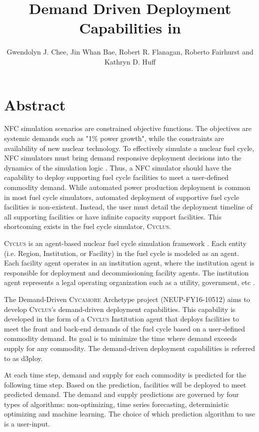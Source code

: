 \documentclass{anstrans}
\title{Demand Driven Deployment Capabilities in \Cyclus}
\author{Gwendolyn J. Chee, Jin Whan Bae, Robert R. Flanagan, Roberto Fairhurst and Kathryn D. Huff}
\institute{
Dept. of Nuclear, Plasma and Radiological Engineering, University of Illinois at Urbana-Champaign \\
gchee2@illinois.edu
}
\newcommand{\Cyclus}{\textsc{Cyclus}\xspace}%
\newcommand{\Cycamore}{\textsc{Cycamore}\xspace}%
\begin{document}
\section{Abstract}
\gls{NFC} simulation scenarios are constrained objective functions. 
The objectives are systemic demands such as "1\% power growth", while the 
constraints are availability of new nuclear technology. 
To effectively simulate a nuclear fuel cycle, \gls{NFC} simulators 
must bring demand responsive deployment decisions into the dynamics of the 
simulation logic \cite{huff_current_2017}. 
Thus, a \gls{NFC} simulator should have the capability to deploy 
supporting fuel cycle facilities to meet a user-defined commodity demand. 
While automated power production deployment is common in most fuel cycle simulators, automated deployment of supportive fuel cycle 
facilities is non-existent. 
Instead, the user must detail the deployment timeline of all supporting 
facilities or have infinite capacity support facilities. This shortcoming 
exists in the fuel cycle simulator, \Cyclus. 

\Cyclus is an agent-based nuclear fuel cycle simulation framework 
\cite{huff_fundamental_2016}. 
Each entity (i.e. Region, Institution, or Facility) in the fuel cycle is modeled 
as an agent. 
Each facility agent operates in an institution agent, where the institution 
agent is responsible for deployment and decommissioning facility agents. 
The institution agent represents a legal operating organization such as a 
utility, government, etc \cite{huff_fundamental_2016}. 

The Demand-Driven \Cycamore Archetype project (NEUP-FY16-10512) aims to 
develop \Cyclus's demand-driven deployment capabilities. 
This capability is developed in the form of a \Cyclus Institution agent that 
deploys facilities to meet the front and back-end demands of the fuel cycle 
based on a user-defined commodity demand. 
Its goal is to minimize the time where demand exceeds supply for any commodity.
The demand-driven deployment capabilities is referred to as d3ploy. 

At each time step, demand and supply for each commodity is predicted for the 
following time step. Based on the prediction, facilities will be deployed to 
meet predicted demand. 
The demand and supply predictions are governed by four types of algorithms: 
non-optimizing, time series forecasting, deterministic optimizing and machine 
learning. 
The choice of which prediction algorithm to use is a user-input. 
\end{document}
